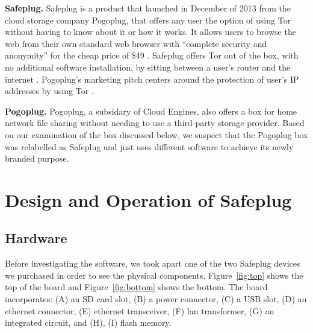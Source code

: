 \documentclass[conference]{IEEEtran}
\begin{document}
{\bf Safeplug.} Safeplug is a product that launched in December of 2013 from the cloud storage company Pogoplug, that offers any user the option of using Tor without having to know about it or how it works.  It allows users to browse the web from their own standard web browser with “complete security and anonymity” for the cheap price of \$49 \cite{safeplug}.  Safeplug offers Tor out of the box, with no additional software installation, by sitting between a user's router and the internet \cite{wired}.  Pogoplug’s marketing pitch centers around the protection of user’s IP addresses by using Tor \cite{safeplug,bittech}.

{\bf Pogoplug.} Pogoplug, a subsidary of Cloud Engines, also offers a box for home network file sharing without needing to use a third-party storage provider.  Based on our examination of the box discussed below, we suspect that the Pogoplug box was relabelled as Safeplug and just uses different software to achieve its newly branded purpose.

\section{Design and Operation of Safeplug}
\subsection{Hardware}
Before investigating the software, we took apart one of the two Safeplug devices we purchased in order to see the physical components.  Figure~\ref{fig:top} shows the top of the board and Figure~\ref{fig:bottom} shows the bottom.  The board incorporates: (A) an SD card slot, (B) a power connector, (C) a USB slot, (D) an ethernet connector, (E) ethernet transceiver, (F) lan transformer, (G) an integrated circuit, and (H), (I) flash memory.
\end{document}
